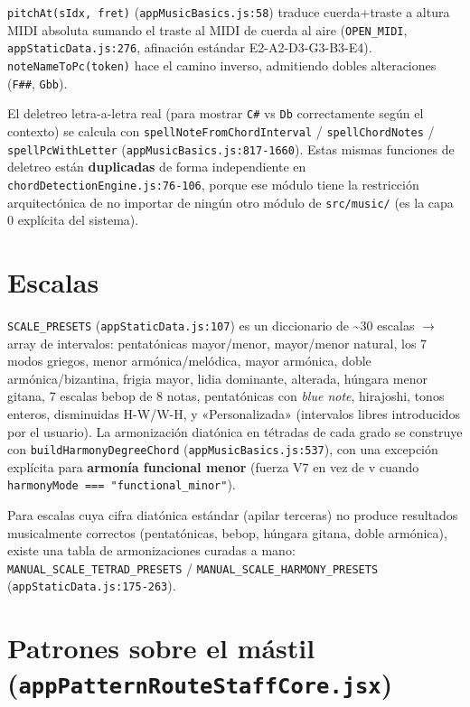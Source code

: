 \documentclass[a4paper,11pt,oneside]{report}
\begin{document}
\lstinline!pitchAt(sIdx, fret)! (\lstinline!appMusicBasics.js:58!) traduce cuerda+traste a altura MIDI absoluta sumando el traste al MIDI de cuerda al aire (\lstinline!OPEN_MIDI!, \lstinline!appStaticData.js:276!, afinación estándar E2-A2-D3-G3-B3-E4). \lstinline!noteNameToPc(token)! hace el camino inverso, admitiendo dobles alteraciones (\lstinline!F##!, \lstinline!Gbb!).

\begin{notabox}
El deletreo letra-a-letra real (para mostrar \lstinline!C#! vs \lstinline!Db! correctamente según el contexto) se calcula con \lstinline!spellNoteFromChordInterval! / \lstinline!spellChordNotes! / \lstinline!spellPcWithLetter! (\lstinline!appMusicBasics.js:817-1660!). Estas mismas funciones de deletreo están \textbf{duplicadas} de forma independiente en \lstinline!chordDetectionEngine.js:76-106!, porque ese módulo tiene la restricción arquitectónica de no importar de ningún otro módulo de \lstinline!src/music/! (es la capa 0 explícita del sistema).
\end{notabox}

\section{Escalas}
\label{sec:7.2}

\lstinline!SCALE_PRESETS! (\lstinline!appStaticData.js:107!) es un diccionario de \textasciitilde30 escalas $\to$ array de intervalos: pentatónicas mayor/menor, mayor/menor natural, los 7 modos griegos, menor armónica/melódica, mayor armónica, doble armónica/bizantina, frigia mayor, lidia dominante, alterada, húngara menor gitana, 7 escalas bebop de 8 notas, pentatónicas con \textit{blue note}, hirajoshi, tonos enteros, disminuidas H-W/W-H, y «Personalizada» (intervalos libres introducidos por el usuario). La armonización diatónica en tétradas de cada grado se construye con \lstinline!buildHarmonyDegreeChord! (\lstinline!appMusicBasics.js:537!), con una excepción explícita para \textbf{armonía funcional menor} (fuerza V7 en vez de v cuando \lstinline!harmonyMode === "functional_minor"!).

Para escalas cuya cifra diatónica estándar (apilar terceras) no produce resultados musicalmente correctos (pentatónicas, bebop, húngara gitana, doble armónica), existe una tabla de armonizaciones curadas a mano: \lstinline!MANUAL_SCALE_TETRAD_PRESETS! / \lstinline!MANUAL_SCALE_HARMONY_PRESETS! (\lstinline!appStaticData.js:175-263!).

\section{Patrones sobre el mástil (\texttt{appPatternRouteStaffCore.jsx})}
\label{sec:7.3}
\end{document}
